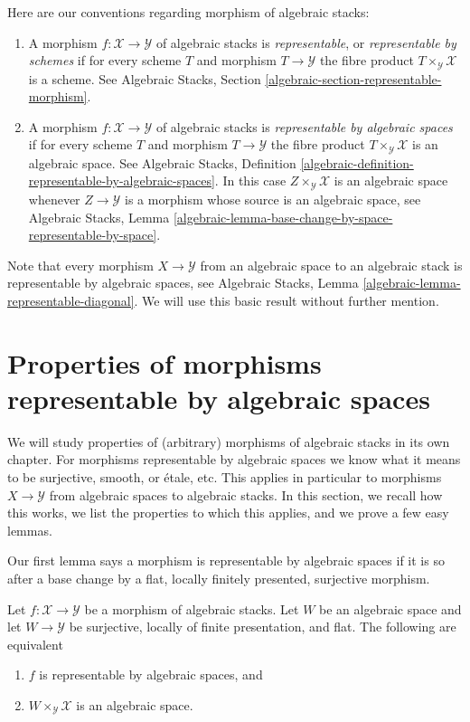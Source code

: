 \medskip\noindent
Here are our conventions regarding morphism of algebraic stacks:
\begin{enumerate}
\item A morphism $f : \mathcal{X} \to \mathcal{Y}$
of algebraic stacks is {\it representable}, or
{\it representable by schemes} if for every scheme
$T$ and morphism $T \to \mathcal{Y}$ the fibre product
$T \times_{\mathcal{Y}} \mathcal{X}$ is a scheme.
See
Algebraic Stacks, Section \ref{algebraic-section-representable-morphism}.
\item A morphism $f : \mathcal{X} \to \mathcal{Y}$
of algebraic stacks is {\it representable by algebraic spaces}
if for every scheme $T$ and morphism $T \to \mathcal{Y}$ the fibre product
$T \times_{\mathcal{Y}} \mathcal{X}$ is an algebraic space.
See Algebraic Stacks,
Definition \ref{algebraic-definition-representable-by-algebraic-spaces}.
In this case $Z \times_{\mathcal{Y}} \mathcal{X}$ is an algebraic
space whenever $Z \to \mathcal{Y}$ is a morphism whose source is
an algebraic space, see
Algebraic Stacks,
Lemma \ref{algebraic-lemma-base-change-by-space-representable-by-space}.
\end{enumerate}
Note that every morphism $X \to \mathcal{Y}$ from an algebraic space
to an algebraic stack is representable by algebraic spaces, see
Algebraic Stacks, Lemma \ref{algebraic-lemma-representable-diagonal}.
We will use this basic result without further mention.




\section{Properties of morphisms representable by algebraic spaces}
\label{section-properties-morphisms}

\noindent
We will study properties of (arbitrary) morphisms of algebraic stacks in its
own chapter. For morphisms representable by algebraic spaces we know what
it means to be surjective, smooth, or \'etale, etc. This applies in particular
to morphisms $X \to \mathcal{Y}$ from algebraic spaces to algebraic stacks.
In this section, we recall how this works, we list the properties to which
this applies, and we prove a few easy lemmas.

\medskip\noindent
Our first lemma says a morphism is representable by algebraic spaces
if it is so after a base change by a flat,
locally finitely presented, surjective morphism.

\begin{lemma}
\label{lemma-check-representable-covering}
Let $f : \mathcal{X} \to \mathcal{Y}$ be a morphism of algebraic stacks.
Let $W$ be an algebraic space and let $W \to \mathcal{Y}$ be surjective,
locally of finite presentation, and flat. The following are equivalent
\begin{enumerate}
\item $f$ is representable by algebraic spaces, and
\item $W \times_{\mathcal{Y}} \mathcal{X}$ is an algebraic space.
\end{enumerate}
\end{lemma}

